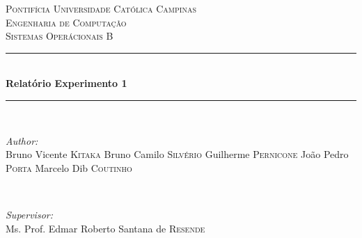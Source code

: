 \begin{titlepage}

\newcommand{\HRule}{\rule{\linewidth}{0.5mm}} %

\center %
 

\textsc{\LARGE Pontifícia Universidade Católica Campinas}\\[1.5cm] %
\textsc{\Large Engenharia de Computação}\\[0.5cm] %
\textsc{\large Sistemas Operácionais B}\\[0.5cm] %


\HRule \\[0.4cm]
{ \huge \bfseries Relatório Experimento 1}\\[0.4cm] %
\HRule \\[1.5cm]
 

\begin{minipage}{0.4\textwidth}
\begin{flushleft} \large
\emph{Author:}\\
Bruno Vicente \textsc{Kitaka}
Bruno Camilo \textsc{Silvério}
Guilherme \textsc{Pernicone}
João Pedro \textsc{Porta}
Marcelo Dib \textsc{Coutinho}
\end{flushleft}
\end{minipage}
~
\begin{minipage}{0.4\textwidth}
\begin{flushright} \large
\emph{Supervisor:} \\
Ms. Prof. Edmar Roberto Santana de \textsc{Resende} %
\end{flushright}
\end{minipage}\\[2cm]


\end{titlepage}
